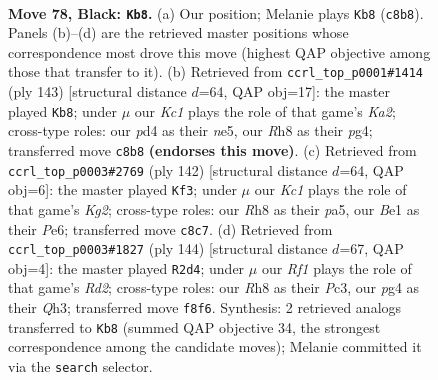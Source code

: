 \documentclass[11pt]{article}
\begin{document}
\clearpage

\begin{figure}[p]\centering
\begin{subfigure}{0.46\textwidth}\centering
\resizebox{\linewidth}{!}{%
\newchessgame
\chessboard[
  setfen={2k2r1r/p5p1/7p/7P/3PQ1P1/2q1P3/7N/4b2K b - - 6 78},
  showmover=false,
  pgfstyle=straightmove, color=movearrow, markmove={c8-b8}
]}
\caption{}
\end{subfigure}\hfill
\begin{subfigure}{0.46\textwidth}\centering
\resizebox{\linewidth}{!}{%
\newchessgame
\chessboard[
  setfen={8/k1q5/1p6/1P1QNK2/3P2P1/p1r5/5P2/8 b - - 12 72},
  showmover=false,
  pgfstyle=straightmove, color=movearrow, markmove={a7-b8}
]}
\caption{}
\end{subfigure}
\\[4pt]
\begin{subfigure}{0.46\textwidth}\centering
\resizebox{\linewidth}{!}{%
\newchessgame
\chessboard[
  setfen={6nk/5Q1p/4P1p1/p2p2q1/8/1p6/1P3RK1/8 w - - 16 72},
  showmover=false,
  pgfstyle=straightmove, color=movearrow, markmove={g2-f3}
]}
\caption{}
\end{subfigure}\hfill
\begin{subfigure}{0.46\textwidth}\centering
\resizebox{\linewidth}{!}{%
\newchessgame
\chessboard[
  setfen={4r1k1/5p2/2q4p/3R2pP/2n1P3/2P4Q/3R2K1/8 w - - 52 73},
  showmover=false,
  pgfstyle=straightmove, color=movearrow, markmove={d2-d4}
]}
\caption{}
\end{subfigure}
\caption{\textbf{Move 78, Black: \texttt{Kb8}.} (a) Our position; Melanie plays \texttt{Kb8} (\texttt{c8b8}). Panels (b)--(d) are the retrieved master positions whose correspondence most drove this move (highest QAP objective among those that transfer to it). (b) Retrieved from \texttt{ccrl\_top\_p0001\#1414} (ply 143) [structural distance $d$=64, QAP obj=17]: the master played \texttt{Kb8}; under $\mu$ our \emph{Kc1} plays the role of that game's \emph{Ka2}; cross-type roles: our \emph{p}d4 as their \emph{n}e5, our \emph{R}h8 as their \emph{p}g4; transferred move \texttt{c8b8} \textbf{(endorses this move)}. (c) Retrieved from \texttt{ccrl\_top\_p0003\#2769} (ply 142) [structural distance $d$=64, QAP obj=6]: the master played \texttt{Kf3}; under $\mu$ our \emph{Kc1} plays the role of that game's \emph{Kg2}; cross-type roles: our \emph{R}h8 as their \emph{p}a5, our \emph{B}e1 as their \emph{P}e6; transferred move \texttt{c8c7}. (d) Retrieved from \texttt{ccrl\_top\_p0003\#1827} (ply 144) [structural distance $d$=67, QAP obj=4]: the master played \texttt{R2d4}; under $\mu$ our \emph{Rf1} plays the role of that game's \emph{Rd2}; cross-type roles: our \emph{R}h8 as their \emph{P}c3, our \emph{p}g4 as their \emph{Q}h3; transferred move \texttt{f8f6}. Synthesis: 2 retrieved analogs transferred to \texttt{Kb8} (summed QAP objective 34, the strongest correspondence among the candidate moves); Melanie committed it via the \texttt{search} selector.}
\label{fig:thought-m155}
\end{figure}
\end{document}
